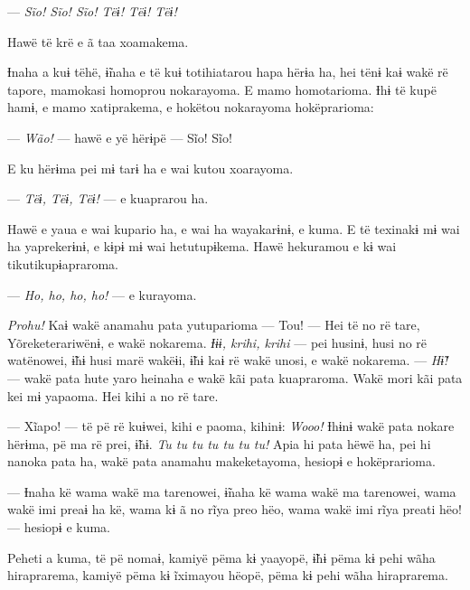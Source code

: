 --- \textit{Sĩo! Sĩo! Sĩo! Tëɨ! Tëɨ! Tëɨ!} 

Hawë të krë e ã taa xoamakema. 

Ɨnaha a kuɨ tëhë, ɨ̃naha e të kuɨ totihiatarou hapa hërɨa ha, hei tënɨ
kaɨ wakë rë tapore, mamokasi homoprou nokarayoma. E mamo homotarioma.
Ɨhɨ të kupë hamɨ, e mamo xatiprakema, e hokëtou nokarayoma hokëprarioma:

--- \textit{Wão!} --- hawë e yë hërɨpë --- Sĩo! Sĩo! 

E ku hërɨma pei mɨ tarɨ ha e wai kutou xoarayoma. 

--- \textit{Tëɨ, Tëɨ, Tëɨ!} --- e kuaprarou ha. 

Hawë e yaua e wai kupario ha, e wai ha wayakarɨnɨ, e kuma. E të texinakɨ
mɨ wai ha yaprekerɨnɨ, e kɨpɨ mɨ wai hetutupɨkema. Hawë hekuramou e kɨ
wai tikutikupɨapraroma. 


--- \textit{Ho, ho, ho, ho!} --- e kurayoma. 

\textit{Prohu!} Kaɨ wakë anamahu pata yutuparioma --- Tou! --- Hei të no rë tare,
Yõreketerariwënɨ, e wakë nokarema. \textit{Ɨɨɨ, krihi, krihi} --- pei husinɨ,
husi no rë watënowei, ɨ̃hɨ husi marë wakëɨi, ɨ̃hɨ kaɨ rë wakë unosi, e wakë
nokarema. --- \textit{Hɨ̃!} --- wakë pata hute yaro heinaha e wakë kãi pata
kuapraroma. Wakë mori kãi pata kei mɨ yapaoma. Hei kihi a no rë tare. 

--- Xĩapo! --- të pë rë kuɨwei, kihi e paoma, kihinɨ: \textit{Wooo!} Ɨhɨnɨ wakë
pata nokare hërɨma, pë ma rë prei, ɨ̃hɨ. \textit{Tu tu tu tu tu tu tu!} Apia hi
pata hëwë ha, pei hi nanoka pata ha, wakë pata anamahu makeketayoma,
hesiopɨ e hokëprarioma. 


--- Ɨnaha kë wama wakë ma tarenowei, ɨ̃naha kë wama wakë ma tarenowei,
wama wakë imi preaɨ ha kë, wama kɨ ã no rĩya preo hëo, wama wakë imi
rĩya preati hëo! --- hesiopɨ e kuma. 

Peheti a kuma, të pë nomaɨ, kamiyë pëma kɨ yaayopë, ɨ̃hɨ pëma kɨ pehi
wãha hiraprarema, kamiyë pëma kɨ ĩximayou hëopë, pëma kɨ pehi wãha
hiraprarema. 

